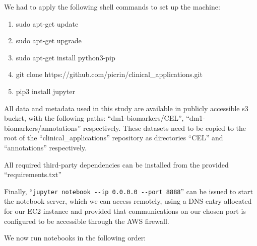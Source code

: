 \documentclass[10pt,letterpaper]{article}
\begin{document}
We had to apply the following shell commands to set up the machine:


\begin{enumerate}

\item sudo apt-get update
\item sudo apt-get upgrade
\item sudo apt-get install python3-pip
\item git clone https://github.com/picrin/clinical\_applications.git
\item pip3 install jupyter

\end{enumerate}

All data and metadata used in this study are available in publicly accessible s3 bucket, with the following paths: ``dm1-biomarkers/CEL'', ``dm1-biomarkers/annotations'' respectively. These datasets need to be copied to the root of the ``clinical\_applications'' repository as directories ``CEL'' and ``annotations'' respectively.

All required third-party dependencies can be installed from the provided ``requirements.txt''

Finally, ``\lstinline{jupyter notebook --ip 0.0.0.0 --port 8888}'' can be issued to start the notebook server, which we can access remotely, using a DNS entry allocated for our EC2 instance and provided that communications on our chosen port is configured to be accessible through the AWS firewall.

We now run notebooks in the following order:
\end{document}
